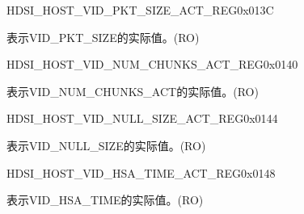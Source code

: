     
    \begin{register}{H}{DSI\_HOST\_VID\_PKT\_SIZE\_ACT\_REG}{0x013C}\label{regdesc:DSIHOSTVIDPKTSIZEACTREG}
    \regnewline%
    \begin{regdesc}\begin{reglist}
    \label{fielddesc:DSIHOSTVIDPKTSIZEACT}\item [DSI\_HOST\_VID\_PKT\_SIZE\_ACT] 表示VID\_PKT\_SIZE的实际值。(RO)
    \end{reglist}\end{regdesc}
    \end{register}
    
    
    \begin{register}{H}{DSI\_HOST\_VID\_NUM\_CHUNKS\_ACT\_REG}{0x0140}\label{regdesc:DSIHOSTVIDNUMCHUNKSACTREG}
    \regnewline%
    \begin{regdesc}\begin{reglist}
    \label{fielddesc:DSIHOSTVIDNUMCHUNKSACT}\item [DSI\_HOST\_VID\_NUM\_CHUNKS\_ACT] 表示VID\_NUM\_CHUNKS\_ACT的实际值。(RO)
    \end{reglist}\end{regdesc}
    \end{register}
    
    
    \begin{register}{H}{DSI\_HOST\_VID\_NULL\_SIZE\_ACT\_REG}{0x0144}\label{regdesc:DSIHOSTVIDNULLSIZEACTREG}
    \regnewline%
    \begin{regdesc}\begin{reglist}
    \label{fielddesc:DSIHOSTVIDNULLSIZEACT}\item [DSI\_HOST\_VID\_NULL\_SIZE\_ACT] 表示VID\_NULL\_SIZE的实际值。(RO)
    \end{reglist}\end{regdesc}
    \end{register}
    
    
    \begin{register}{H}{DSI\_HOST\_VID\_HSA\_TIME\_ACT\_REG}{0x0148}\label{regdesc:DSIHOSTVIDHSATIMEACTREG}
    \regnewline%
    \begin{regdesc}\begin{reglist}
    \label{fielddesc:DSIHOSTVIDHSATIMEACT}\item [DSI\_HOST\_VID\_HSA\_TIME\_ACT] 表示VID\_HSA\_TIME的实际值。(RO)
    \end{reglist}\end{regdesc}
    \end{register}
    
